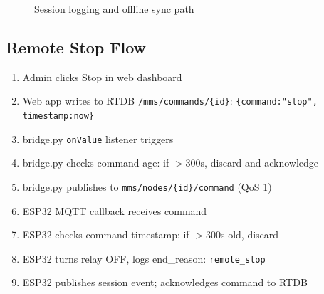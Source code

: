 \begin{figure}[H]
\centering
{}
\caption{Session logging and offline sync path}
\label{fig:session_sync_flow}
\end{figure}

\subsection{Remote Stop Flow}

\begin{enumerate}[leftmargin=1.5em]
    \item Admin clicks Stop in web dashboard
    \item Web app writes to RTDB \texttt{/mms/commands/\{id\}}: \texttt{\{command:"stop", timestamp:now\}}
    \item bridge.py \texttt{onValue} listener triggers
    \item bridge.py checks command age: if $>$300s, discard and acknowledge
    \item bridge.py publishes to \texttt{mms/nodes/\{id\}/command} (QoS 1)
    \item ESP32 MQTT callback receives command
    \item ESP32 checks command timestamp: if $>$300s old, discard
    \item ESP32 turns relay OFF, logs end\_reason: \texttt{remote\_stop}
    \item ESP32 publishes session event; acknowledges command to RTDB
\end{enumerate}

